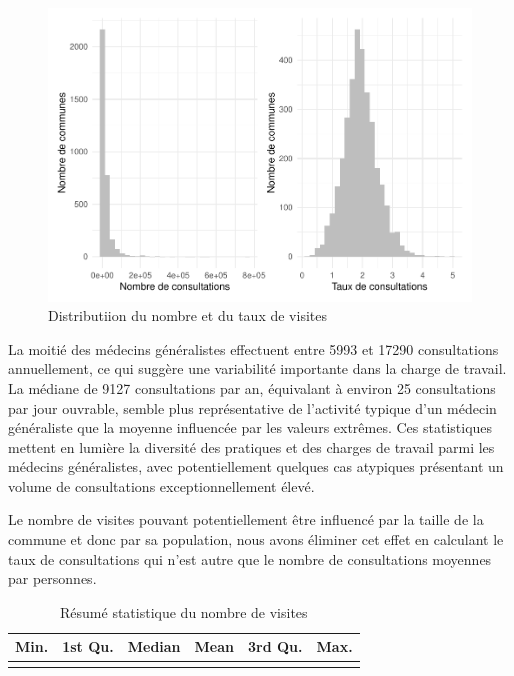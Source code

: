 \documentclass[
]{article}
\begin{document}
\begin{figure}

{\centering \includegraphics{4_Analyse_Descriptive_files/figure-latex/unnamed-chunk-6-1} 

}

\caption{Distributiion du nombre et du taux de visites}\label{fig:unnamed-chunk-6}
\end{figure}

La moitié des médecins généralistes effectuent entre 5993 et 17290
consultations annuellement, ce qui suggère une variabilité importante
dans la charge de travail. La médiane de 9127 consultations par an,
équivalant à environ 25 consultations par jour ouvrable, semble plus
représentative de l'activité typique d'un médecin généraliste que la
moyenne influencée par les valeurs extrêmes. Ces statistiques mettent en
lumière la diversité des pratiques et des charges de travail parmi les
médecins généralistes, avec potentiellement quelques cas atypiques
présentant un volume de consultations exceptionnellement élevé.

Le nombre de visites pouvant potentiellement être influencé par la
taille de la commune et donc par sa population, nous avons éliminer cet
effet en calculant le taux de consultations qui n'est autre que le
nombre de consultations moyennes par personnes.

\begin{table}[H]
\centering
\caption{\label{tab:unnamed-chunk-7}Résumé statistique du nombre de visites}
\centering
\begin{tabular}[t]{rrrrrr}
\toprule
Min. & 1st Qu. & Median & Mean & 3rd Qu. & Max.\\
\midrule
\cellcolor{gray!10}{1037} & \cellcolor{gray!10}{5993} & \cellcolor{gray!10}{9127} & \cellcolor{gray!10}{19129.63} & \cellcolor{gray!10}{17290} & \cellcolor{gray!10}{765833}\\
\bottomrule
\end{tabular}
\end{table}
\end{document}
